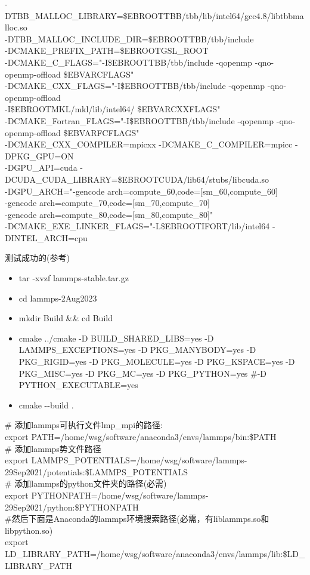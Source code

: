 \documentclass[10pt,a4paper]{article}
\begin{document}
-DTBB\_MALLOC\_LIBRARY=\$EBROOTTBB/tbb/lib/intel64/gcc4.8/libtbbmalloc.so \\
-DTBB\_MALLOC\_INCLUDE\_DIR=\$EBROOTTBB/tbb/include \\
-DCMAKE\_PREFIX\_PATH=\$EBROOTGSL\_ROOT \\
-DCMAKE\_C\_FLAGS="-I\$EBROOTTBB/tbb/include -qopenmp -qno-openmp-offload \$EBVARCFLAGS" \\
-DCMAKE\_CXX\_FLAGS="-I\$EBROOTTBB/tbb/include -qopenmp -qno-openmp-offload \\
-I\$EBROOTMKL/mkl/lib/intel64/ \$EBVARCXXFLAGS" \\
-DCMAKE\_Fortran\_FLAGS="-I\$EBROOTTBB/tbb/include -qopenmp -qno-openmp-offload \$EBVARFCFLAGS" \\
-DCMAKE\_CXX\_COMPILER=mpicxx -DCMAKE\_C\_COMPILER=mpicc -DPKG\_GPU=ON \\
-DGPU\_API=cuda -DCUDA\_CUDA\_LIBRARY=\$EBROOTCUDA/lib64/stubs/libcuda.so \\
-DGPU\_ARCH="-gencode arch=compute\_60,code=[sm\_60,compute\_60] \\
-gencode arch=compute\_70,code=[sm\_70,compute\_70] \\
-gencode arch=compute\_80,code=[sm\_80,compute\_80]" \\
-DCMAKE\_EXE\_LINKER\_FLAGS="-L\$EBROOTIFORT/lib/intel64 -DINTEL\_ARCH=cpu

测试成功的(参考)
\begin{itemize}
	\item \textrm{tar -xvzf lammps-stable.tar.gz}
	\item \textrm{cd lammps-2Aug2023}
	\item \textrm{mkdir Build \&\& cd Build}
	\item \textrm{cmake ../cmake -D BUILD\_SHARED\_LIBS=yes -D LAMMPS\_EXCEPTIONS=yes  -D PKG\_MANYBODY=yes -D PKG\_RIGID=yes -D PKG\_MOLECULE=yes -D PKG\_KSPACE=yes -D PKG\_MISC=yes -D PKG\_MC=yes  -D PKG\_PYTHON=yes \#-D PYTHON\_EXECUTABLE=yes}
	\item \textrm{cmake -\/-build .}
\end{itemize}

\# 添加\textrm{lammps}可执行文件\textrm{lmp_mpi}的路径:\\
\textrm{export PATH=/home/wsg/software/anaconda3/envs/lammps/bin:\$PATH}\\
\# 添加\textrm{lammps}势文件路径\\
\textrm{export LAMMPS\_POTENTIALS=/home/wsg/software/lammps-29Sep2021/potentials:\$LAMMPS\_POTENTIALS}\\
\# 添加\textrm{lammps}的\textrm{python}文件夹的路径(必需)\\
\textrm{export PYTHONPATH=/home/wsg/software/lammps-29Sep2021/python:\$PYTHONPATH}\\
\#然后下面是\textrm{Anaconda}的\textrm{lammps}环境搜索路径(必需，有\textrm{liblammps.so}和\textrm{libpython.so})\\
\textrm{export LD\_LIBRARY\_PATH=/home/wsg/software/anaconda3/envs/lammps/lib:\$LD\_LIBRARY\_PATH}
\end{document}
